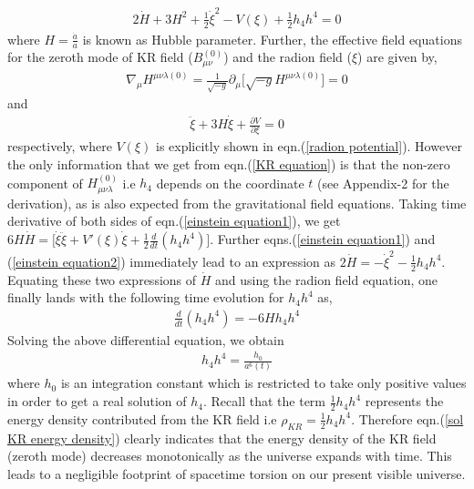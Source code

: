\documentclass[a4paper]{article}
\begin{document}
\begin{eqnarray}
 2\dot{H} + 3H^2 + \frac{1}{2}\dot{\xi}^2 - V(\xi) + \frac{1}{2}h_4h^4 = 0
 \label{einstein equation2}
\end{eqnarray}
where $H=\frac{\dot{a}}{a}$ is known as Hubble parameter. Further, the effective field equations for the zeroth mode of KR field ($B_{\mu\nu}^{(0)}$) 
and the radion field ($\xi$) are given by,
\begin{eqnarray}
 \nabla_{\mu}H^{\mu\nu\lambda(0)} = \frac{1}{\sqrt{-g}}\partial_{\mu}\bigg[\sqrt{-g}H^{\mu\nu\lambda(0)}\bigg] = 0
 \label{KR equation}
\end{eqnarray}
and
\begin{eqnarray}
 \ddot{\xi} + 3H\dot{\xi} + \frac{\partial V}{\partial\xi} = 0
 \label{radion equation}
\end{eqnarray}
respectively, where $V(\xi)$ is explicitly shown in eqn.(\ref{radion potential}). 
However the only information that we get from eqn.(\ref{KR equation}) is that the non-zero component of $H_{\mu\nu\lambda}^{(0)}$ 
i.e $h_4$ depends on the coordinate $t$ (see Appendix-2 for the derivation), as is also expected from the gravitational field equations. 
Taking time derivative of both sides of 
eqn.(\ref{einstein equation1}), we get $6H\dot{H}=\bigg[\dot{\xi}\ddot{\xi}+V'(\xi)\dot{\xi}+\frac{1}{2}\frac{d}{dt}(h_4h^4)\bigg]$. Further 
eqns.(\ref{einstein equation1}) and (\ref{einstein equation2}) immediately lead to an expression as 
$2\dot{H}=-\dot{\xi}^2-\frac{1}{2}h_4h^4$. Equating these two expressions of $\dot{H}$ and using the radion field equation, one finally lands with 
the following time evolution for $h_4h^4$ as,
\begin{eqnarray}
 \frac{d}{dt}(h_4h^4) = -6Hh_4h^4
 \nonumber
\end{eqnarray}
Solving the above differential equation, we obtain
\begin{eqnarray}
 h_4h^4 = \frac{h_0}{a^6(t)}
 \label{sol KR energy density}
\end{eqnarray}
where $h_0$ is an integration constant which is restricted to take only positive values in order to get a real solution of $h_4$. 
Recall that the term $\frac{1}{2}h_4h^4$ represents the energy density contributed from the KR field i.e $\rho_{KR} = \frac{1}{2}h_4h^4$. Therefore 
eqn.(\ref{sol KR energy density}) clearly indicates that the energy density of the KR field (zeroth mode) decreases monotonically as the universe 
expands with time. This leads to a negligible footprint of spacetime torsion on our present visible universe. 
\end{document}
